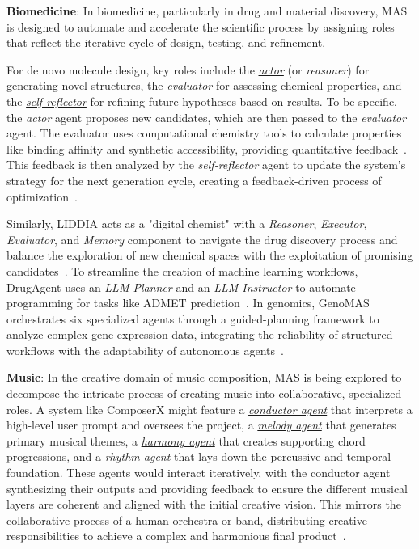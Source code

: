 \textbf{Biomedicine}:
In biomedicine, particularly in drug and material discovery, MAS is designed to automate and accelerate the scientific process by assigning roles that reflect the iterative cycle of design, testing, and refinement.

For de novo molecule design, key roles include the \underline{\emph{actor}} (or \emph{reasoner}) for generating novel structures, the \underline{\emph{evaluator}} for assessing chemical properties, and the \underline{\emph{self-reflector}} for refining future hypotheses based on results.
To be specific, the \emph{actor} agent proposes new candidates, which are then passed to the \emph{evaluator} agent. The evaluator uses computational chemistry tools to calculate properties like binding affinity and synthetic accessibility, providing quantitative feedback~\cite{averly2025liddia}. This feedback is then analyzed by the \emph{self-reflector} agent to update the system's strategy for the next generation cycle, creating a feedback-driven process of optimization~\cite{OSDA}.

Similarly, LIDDIA acts as a "digital chemist" with a \emph{Reasoner}, \emph{Executor}, \emph{Evaluator}, and \emph{Memory} component to navigate the drug discovery process and balance the exploration of new chemical spaces with the exploitation of promising candidates~\cite{averly2025liddia}. To streamline the creation of machine learning workflows, DrugAgent uses an \emph{LLM Planner} and an \emph{LLM Instructor} to automate programming for tasks like ADMET prediction~\cite{liu2024drugagent}. In genomics, GenoMAS orchestrates six specialized agents through a guided-planning framework to analyze complex gene expression data, integrating the reliability of structured workflows with the adaptability of autonomous agents~\cite{liu2025genomas}.

\textbf{Music}: In the creative domain of music composition, MAS is being explored to decompose the intricate process of creating music into collaborative, specialized roles. A system like ComposerX might feature a \underline{\emph{conductor agent}} that interprets a high-level user prompt and oversees the project, a \underline{\emph{melody agent}} that generates primary musical themes, a \underline{\emph{harmony agent}} that creates supporting chord progressions, and a \underline{\emph{rhythm agent}} that lays down the percussive and temporal foundation. These agents would interact iteratively, with the conductor agent synthesizing their outputs and providing feedback to ensure the different musical layers are coherent and aligned with the initial creative vision. This mirrors the collaborative process of a human orchestra or band, distributing creative responsibilities to achieve a complex and harmonious final product~\cite{ComposerX}.

